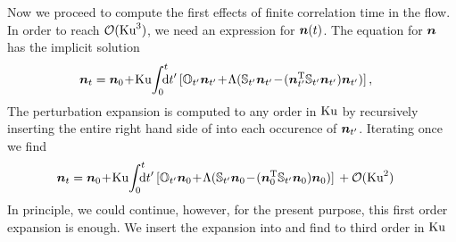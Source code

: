 \documentclass[thesis.tex]{subfiles}
\begin{document}
Now we proceed to compute the first effects of finite correlation time in the flow. In order to reach $\mathcal O(\mbox{Ku}^3)$, we need an expression for $\mbox{\boldmath$n$}(t)$.
The equation for $\mbox{\boldmath$n$}$ has the implicit solution
\begin{align}
\ve n_{t}&=\ve n_0\!+\!\ku\!\int_0^{t}\!\!\!\!{\rm d}t'\,[\ma O_{t'}\ve n_{t'}\!%
+\!\Lambda(\ma S_{t'}\ve n_{t'}\!-\!(\ve n_{t'}\transpose\ma S_{t'}\ve n_{t'})\ve n_{t'})]\,,\eqnlab{n_expansion}
\end{align}
The perturbation expansion is computed  to any order in $\mbox{Ku}$ by recursively inserting the entire right hand side of  into each occurence of $\mbox{\boldmath$n$}_{t'}$.
Iterating once we find
\begin{align}
\ve n_{t}&=\ve n_0\!+\!\ku\!\int_0^{t}\!\!\!\!{\rm d}t'\,[\ma O_{t'}\ve n_{0}\! +\!\Lambda(\ma S_{t'}\ve n_{0}\!-\!(\ve n_{0}\transpose\ma S_{t'}\ve n_{0})\ve n_{0})]\, + \mathcal O(\ku^2)\eqnlab{n_expansion2}
\end{align}
In principle, we could continue, however, for the present purpose, this first order expansion is enough.
We insert the expansion  into  and find to third order in $\mbox{Ku}$
\end{document}
